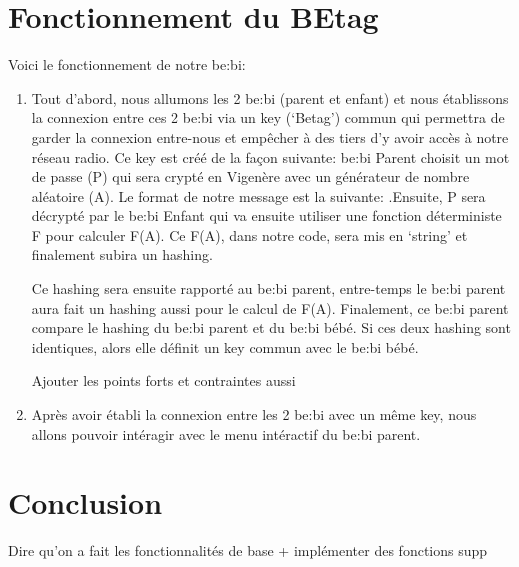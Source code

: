 \documentclass [11pt]{article}
\begin{document}
\section{Fonctionnement du BEtag}
\noindent Voici le fonctionnement de notre be\string:bi:
\begin{enumerate}
    \item Tout d’abord, nous allumons les 2 be\string:bi (parent et enfant) et nous établissons la connexion entre ces 2 be\string:bi via un key (‘Betag’) commun qui permettra de garder la connexion entre-nous et empêcher à des tiers d’y avoir accès à notre réseau radio. Ce key est créé de la façon suivante:
be\string:bi Parent choisit un mot de passe (P) qui sera crypté en Vigenère avec un générateur de nombre aléatoire (A). Le format de notre message est la suivante: .Ensuite, P sera décrypté par le be\string:bi Enfant qui va ensuite utiliser une fonction déterministe F pour calculer F(A). Ce F(A), dans notre code, sera mis en ‘string’ et finalement subira un hashing.
    
\noindent Ce hashing sera ensuite rapporté au be\string:bi parent, entre-temps le be:bi parent aura fait un hashing aussi pour le calcul de F(A). Finalement, ce be:bi parent compare le hashing du be\string:bi parent et du be\string:bi bébé. Si ces deux hashing sont identiques, alors elle définit un key commun avec le be\string:bi bébé.

\noindent Ajouter les points forts et contraintes aussi
    
    \item Après avoir établi la connexion entre les 2 be\string:bi avec un même key, nous allons pouvoir intéragir avec le menu intéractif du be\string:bi parent.

\end{enumerate}

\section{Conclusion}
Dire qu'on a fait les fonctionnalités de base + implémenter des fonctions supp
\end{document}
